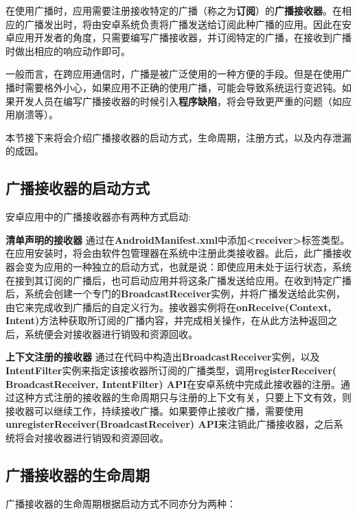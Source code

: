 在使用广播时，应用需要注册接收特定的广播（称之为\textbf{订阅}）的\textbf{广播接收器}。在相应的广播发出时，将由安卓系统负责将广播发送给订阅此种广播的应用。因此在安卓应用开发者的角度，只需要编写广播接收器，并订阅特定的广播，在接收到广播时做出相应的响应动作即可。
	
一般而言，在跨应用通信时，广播是被广泛使用的一种方便的手段。但是在使用广播时需要格外小心，如果应用不正确的使用广播，可能会导致系统运行变迟钝。如果开发人员在编写广播接收器的时候引入\textbf{程序缺陷}，将会导致更严重的问题（如应用崩溃等）。

本节接下来将会介绍广播接收器的启动方式，生命周期，注册方式，以及内存泄漏的成因。

\subsection{广播接收器的启动方式}
安卓应用中的广播接收器亦有两种方式启动\cite{broadcast}:

\textbf{清单声明的接收器 }\label{declaration:receiver in manifest} 通过在\textbf{AndroidManifest.xml}中添加\textbf{<receiver>}标签类型。在应用安装时，将会由软件包管理器在系统中注册此类接收器。此后，此广播接收器会变为应用的一种独立的启动方式，也就是说：即使应用未处于运行状态，系统在接到其订阅的广播后，也可启动应用并将这条广播发送给应用。在收到特定广播后，系统会创建一个专门的\textbf{BroadcastReceiver}实例，并将广播发送给此实例，由它来完成收到广播后的自定义行为。接收器实例将在\textbf{onReceive(Context, Intent)}方法种获取所订阅的广播内容，并完成相关操作，在从此方法种返回之后，系统便会对接收器进行销毁和资源回收。

\textbf{上下文注册的接收器 }\label{declaration:receiver in context} 通过在代码中构造出\textbf{BroadcastReceiver}实例，以及\textbf{IntentFilter}实例来指定该接收器所订阅的广播类型，调用\textbf{registerReceiver(\\BroadcastReceiver, IntentFilter) API}在安卓系统中完成此接收器的注册。通过这种方式注册的接收器的生命周期只与注册的上下文有关，只要上下文有效，则接收器可以继续工作，持续接收广播。如果要停止接收广播，需要使用\textbf{unregisterReceiver(BroadcastReceiver) API}来注销此广播接收器，之后系统将会对接收器进行销毁和资源回收。

\subsection{广播接收器的生命周期}

广播接收器的生命周期根据启动方式不同亦分为两种\cite{broadcast}：

